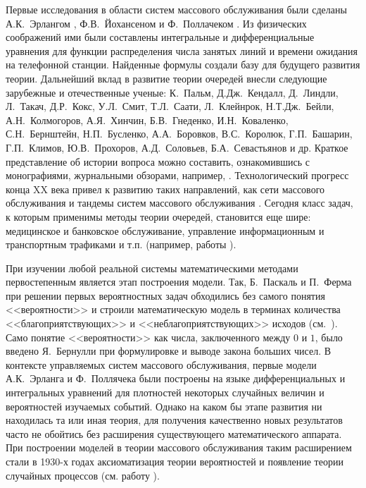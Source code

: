 Первые исследования в области систем массового обслуживания были сделаны  А.К.~Эрлангом \cite{Erlang:1909,Erlang:1917}, Ф.В.~Йохансеном \cite{Johannsen} и Ф.~Поллачеком \cite{Pollaczek:1934}. Из физических соображений ими были составлены интегральные и дифференциальные уравнения для функции распределения числа занятых линий  и времени  ожидания на телефонной станции. Найденные формулы создали базу для будущего развития теории. Дальнейший вклад в развитие теории очередей внесли следующие зарубежные и отечественные ученые: К.~Пальм, Д.Дж.~Кендалл, Д.~Линдли, Л.~Такач, Д.Р.~Кокс, У.Л.~Смит, Т.Л.~Саати, Л.~Клейнрок,  Н.Т.Дж.~Бейли,  А.Н.~Колмогоров, А.Я.~Хинчин, Б.В.~Гнеденко, И.Н.~Коваленко,  С.Н.~Бернштейн, Н.П.~Бусленко, А.А.~Боровков, В.С.~Королюк, Г.П.~Башарин, Г.П.~Климов, Ю.В.~Прохоров, А.Д.~Соловьев,  Б.А.~Севастьянов и др. Краткое представление об истории вопроса можно составить, ознакомившись с монографиями, журнальными обзорами, например, \cite{Borovkov, Bocharov:1995, GnedenkoKovalenko, KoksSmith, Kovalenko:1963, asmussen, kalashnikov}. Технологический прогресс конца XX века привел к развитию таких направлений, как сети массового обслуживания и тандемы систем массового обслуживания \cite{ivnickii, jackson, reich}. Сегодня класс задач, к которым применимы методы теории очередей, становится еще шире: медицинское и банковское обслуживание, управление информационным и транспортным трафиками и т.п. (например, работы \cite{dudin:2011, farhadov, Haight:1963, haidemann, raghavan, rogiest}).
 
При изучении любой реальной системы математическими методами первостепенным является этап построения модели. Так, Б.~Паскаль и П.~Ферма при решении первых вероятностных задач обходились без самого понятия <<вероятности>> и строили математическую модель в терминах количества <<благоприятствующих>> и <<неблагоприятствующих>> исходов (см.~\cite{Gnedenko}). Само понятие <<вероятности>> как числа, заключенного между $0$ и $1$, было введено Я.~Бернулли при формулировке и выводе закона больших чисел. В контексте управляемых систем массового обслуживания, первые модели А.К.~Эрланга и Ф.~Поллячека были построены на языке дифференциальных и интегральных уравнений для плотностей некоторых случайных величин и вероятностей изучаемых событий. Однако на каком бы этапе развития ни находилась та или иная теория, для получения качественно новых результатов часто не обойтись без расширения существующего математического аппарата.  
При построении моделей в теории массового обслуживания таким расширением стали в 1930-х годах аксиоматизация теории вероятностей и появление теории случайных процессов (см. работу \cite{Kolmogorov:1974}).

